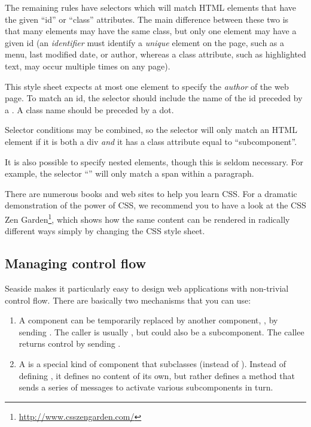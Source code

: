 \documentclass[a4paper,10pt,twoside]{book}
\begin{document}
The remaining rules have selectors which will match HTML elements that have the given ``id'' or ``class'' attributes.
The main difference between these two is that many elements may have the same class, but only one element may have a given id (\ie an \emph{identifier} must identify a \emph{unique} element on the page, such as a menu, last modified date, or author, whereas a class attribute, such as highlighted text, may occur multiple times on any page).

This style sheet expects at most one element to specify the \emph{author} of the web page.
To match an id, the selector should include the name of the id preceded by a \ct{#}.
A class name should be preceded by a dot.

Selector conditions may be combined, so the selector  will only match an HTML element if it is both a div \emph{and} it has a class attribute equal to ``subcomponent''.

It is also possible to specify nested elements, though this is seldom necessary.
For example, the selector ``'' will only match a span within a paragraph.

There are numerous books and web sites to help you learn CSS.
For a dramatic demonstration of the power of CSS, we recommend you to have a look at the CSS Zen Garden\footnote{\url{http://www.csszengarden.com/}}, which shows how the same content can be rendered in radically different ways simply by changing the CSS style sheet.

\subsection{Managing control flow}

Seaside makes it particularly easy to design web applications with non-trivial control flow.
There are basically two mechanisms that you can use:

\begin{enumerate}
  \item A component  can be temporarily replaced by another component, , by sending .
  The caller is usually , but could also be a subcomponent.
  The callee returns control by sending .

  \item A  is a special kind of component that subclasses  (instead of ).
  Instead of defining , it defines no content of its own, but rather defines a  method that sends a series of  messages to activate various subcomponents in turn.
\end{enumerate}
\end{document}
